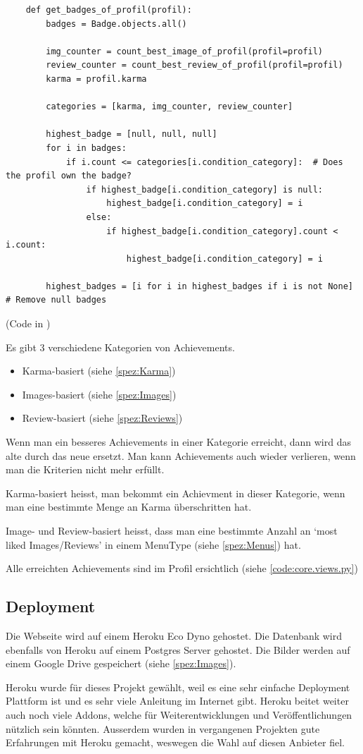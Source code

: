 \begin{lstlisting}
    def get_badges_of_profil(profil):
        badges = Badge.objects.all()

        img_counter = count_best_image_of_profil(profil=profil)
        review_counter = count_best_review_of_profil(profil=profil)
        karma = profil.karma

        categories = [karma, img_counter, review_counter]

        highest_badge = [null, null, null]
        for i in badges:
            if i.count <= categories[i.condition_category]:  # Does the profil own the badge?
                if highest_badge[i.condition_category] is null:
                    highest_badge[i.condition_category] = i
                else:
                    if highest_badge[i.condition_category].count < i.count:
                        highest_badge[i.condition_category] = i
        
        highest_badges = [i for i in highest_badges if i is not None]  # Remove null badges
\end{lstlisting}

(Code in )



Es gibt 3 verschiedene Kategorien von Achievements.
\begin{itemize}
    \item Karma-basiert (siehe \ref{spez:Karma})
    \item Images-basiert (siehe \ref{spez:Images})
    \item Review-basiert (siehe \ref{spez:Reviews})
\end{itemize}

Wenn man ein besseres Achievements in einer Kategorie erreicht, dann wird das
alte durch das neue ersetzt. Man kann Achievements auch wieder verlieren, wenn
man die Kriterien nicht mehr erfüllt.

Karma-basiert heisst, man bekommt ein Achievment in dieser Kategorie, wenn man
eine bestimmte Menge an Karma überschritten hat.

Image- und Review-basiert heisst, dass man eine bestimmte Anzahl an `most liked
Images/Reviews' in einem MenuType (siehe \ref{spez:Menus}) hat.

Alle erreichten Achievements sind im Profil ersichtlich (siehe \ref{code:core.views.py})

\subsection{Deployment} \label{spez:Deployment}

Die Webseite wird auf einem Heroku Eco Dyno gehostet. Die Datenbank wird ebenfalls
von Heroku auf einem Postgres Server gehostet. Die Bilder werden auf einem
Google Drive gespeichert (siehe \ref{spez:Images}).

Heroku wurde für dieses Projekt gewählt, weil es eine sehr einfache
 Deployment Plattform ist und es sehr viele Anleitung im Internet
gibt. Heroku beitet weiter auch noch viele Addons, welche für
Weiterentwicklungen und Veröffentlichungen nützlich sein könnten. Ausserdem
wurden in vergangenen Projekten gute Erfahrungen mit Heroku gemacht, weswegen
die Wahl auf diesen Anbieter fiel.
